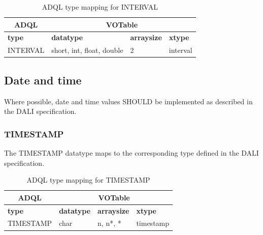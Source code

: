 \documentclass[11pt,a4paper]{ivoa}
\newcommand{\DALIspec} {DALI specification\xspace}
\begin{document}
\begin{table}[thm]\footnotesize
    \begin{tabular}
        {|p{}|p{}|p{}|p{}|}
        \hline

        \hline
        \multicolumn{1}{|c|}{\textbf{ADQL}} &
        \multicolumn{3}{|c|}{\textbf{VOTable}}
        \tabularnewline
        
        \hline
        \textbf{type} &
        \textbf{datatype} &
        \textbf{arraysize} &
        \textbf{xtype}
        \tabularnewline

        \hline
        INTERVAL &
        short, int, float, double &
        2 &
        interval
        \tabularnewline
        \hline
    \end{tabular}
    \caption{ADQL type mapping for INTERVAL}
    \label{table:types.numeric.interval}
\end{table}

\subsection{Date and time}
\label{sec:types.datetime}

Where possible, date and time values SHOULD be implemented as
described in the \DALIspec.

\subsubsection{TIMESTAMP}
\label{sec:types.datetime.timestamp}

The TIMESTAMP datatype maps to the corresponding type defined in the
\DALIspec.

\begin{table}[thm]\footnotesize
    \begin{tabular}
        {|p{}|p{}|p{}|p{}|}
        \hline

        \hline
        \multicolumn{1}{|c|}{\textbf{ADQL}} &
        \multicolumn{3}{|c|}{\textbf{VOTable}}
        \tabularnewline
        
        \hline
        \textbf{type} &
        \textbf{datatype} &
        \textbf{arraysize} &
        \textbf{xtype}
        \tabularnewline

        \hline
        TIMESTAMP &
        char &
        n, n*, * &
        timestamp
        \tabularnewline
        \hline
    \end{tabular}
    \caption{ADQL type mapping for TIMESTAMP}
    \label{table:types.datetime.timestamp}
\end{table}
\end{document}
